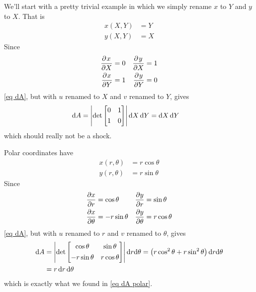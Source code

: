 \begin{eg}\label{eg exchange dA}
We'll start with a pretty trivial example in which we simply rename
$x$ to $Y$ and $y$ to $X$. That is
\begin{align*}
x(X,Y) &= Y \\
y(X,Y) &= X 
\end{align*}
Since
\begin{align*}
\pdiff{x}{X}&=0   &\pdiff{y}{X}&=1 \\
\pdiff{x}{Y}&=1   &\pdiff{y}{Y}&=0 \\
\end{align*}
\eqref{eq dA}, but with $u$ renamed to $X$ and $v$ renamed to $Y$, 
gives
\begin{align*}
\mathrm{d}A &= \left|\det\left[\begin{matrix}0 & 1 \\[0.05in] 
                                         1 & 0
       \end{matrix}\right]\right| \mathrm{d}X\,\mathrm{d}Y 
        = \mathrm{d}X\,\mathrm{d}Y
\end{align*}
which should really not be a shock.

\end{eg}


\begin{eg}\label{eg polar dA}
Polar coordinates have
\begin{align*}
x(r,\theta) &= r\cos\theta \\
y(r,\theta) &= r\sin\theta 
\end{align*}
Since
\begin{align*}
\pdiff{x}{r}&=\cos\theta   &\pdiff{y}{r}&=\sin\theta \\
\pdiff{x}{\theta}&=-r\sin\theta   &\pdiff{y}{\theta}&=r\cos\theta \\
\end{align*}
\eqref{eq dA}, but with $u$ renamed to $r$ and $v$ renamed to $\theta$, 
gives
\begin{align*}
\mathrm{d}A &= \left|\det\left[\begin{matrix}\cos\theta &\sin\theta \\[0.05in] 
                                   -r\sin\theta & r\cos\theta 
       \end{matrix}\right]\right| \mathrm{d}r\mathrm{d}\theta 
   =\big(r\cos^2\theta + r\sin^2\theta\big)\,\mathrm{d}r\mathrm{d}\theta\\
  &= r\,\mathrm{d}r\,\mathrm{d}\theta
\end{align*}
which is exactly what we found in \eqref{eq dA polar}.
\end{eg}



